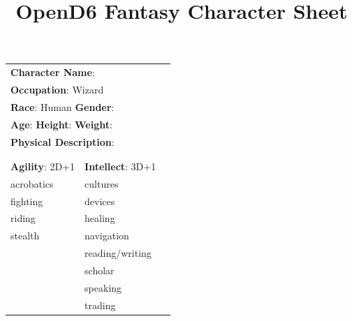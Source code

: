 \documentclass[10pt]{article}
\title{OpenD6 Fantasy Character Sheet}
\begin{document}
\pagestyle{fancy}
\fancyhf{}
\fancyfoot[R]{\thepage}
\renewcommand{\headrulewidth}{0pt}


\cleardoublepage
\begin{table}
\begin{tabular}{m{156pt} m{156pt} m{156pt}}
    \multicolumn{2}{l}{\textbf{Character Name}:  \hrulefill} \\
    \multicolumn{2}{l}{\textbf{Occupation}: Wizard \hrulefill} \\
    \multicolumn{2}{l}{\textbf{Race}: Human \hrulefill \hspace{1em} \textbf{Gender}:  \hrulefill} \\
    \multicolumn{2}{l}{\textbf{Age}:  \hrulefill \hspace{1em} \textbf{Height}:  \hrulefill \hspace{1em}  \textbf{Weight}:  \hrulefill } \\
    \multicolumn{2}{l}{\textbf{Physical Description}:  \hrulefill } \\
    \multicolumn{2}{l}{ \hrulefill } \\
 & & \\
\textbf{Agility}: 2D+1 \hrulefill      & \textbf{Intellect}: 3D+1 \hrulefill  &                             \\

acrobatics           \hrulefill & cultures             \hrulefill & \\

fighting             \hrulefill & devices              \hrulefill & \\

riding               \hrulefill & healing              \hrulefill & \\

stealth              \hrulefill & navigation           \hrulefill & \\

 \hrulefill & reading/writing      \hrulefill & \\

 \hrulefill & scholar              \hrulefill & \\

 \hrulefill & speaking             \hrulefill & \\

 \hrulefill & trading              \hrulefill & \\


\end{tabular}
\end{table}
\end{document}
